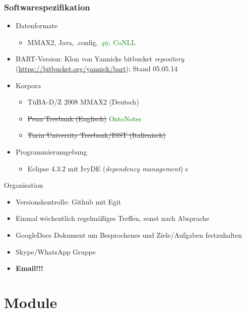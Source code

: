 \documentclass[11pt,a4paper]{beamer}
\begin{document}
\begin{frame}
\frametitle{Softwarespezifikation}

\begin{itemize}

	\item Datenformate
		\begin{itemize}
		\item MMAX2, Java, .config, \textcolor{green}{.py, CoNLL}
	\end{itemize}
	\item BART-Version: Klon von Yannicks bitbucket \textit{repository} (\url{https://bitbucket.org/yannick/bart}); Stand 05.05.14 
	\item Korpora
	\begin{itemize}
		\item TüBA-D/Z 2008 MMAX2 (Deutsch)
		\item \sout{Penn Treebank (Englisch)} \textcolor{green}{OntoNotes}
		\item \sout{Turin University Treebank/ISST (Italienisch)}
	\end{itemize}
	\item Programmierumgebung
	\begin{itemize}
		\item Eclipse 4.3.2 mit IvyDE (\textit{dependency management}) s
	\end{itemize}

\end{itemize}

\end{frame}

\begin{frame}{Organisation} 
	\begin{itemize}
	\item Versionskontrolle: Github mit Egit
	\item Einmal wöchentlich regelmäßiges Treffen, sonst nach Absprache
	\item GoogleDocs Dokument um Besprochenes und Ziele/Aufgaben festzuhalten
	\item Skype/WhatsApp Gruppe
	\item \textbf{Email!!!}
	
	\end{itemize}
\end{frame}
\section{Module}
\end{document}
